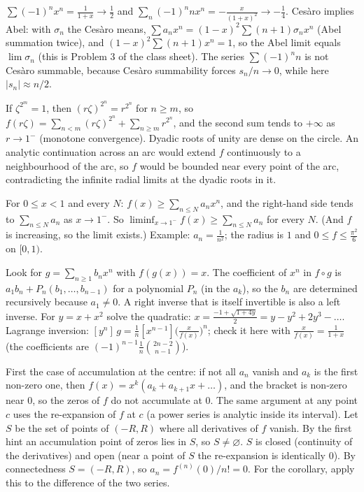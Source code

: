 \documentclass[11pt,a4paper]{article}
\begin{document}
\(\sum(-1)^nx^n=\frac1{1+x}\to\frac12\) and \(\sum_n(-1)^nnx^n=-\frac x{(1+x)^2}\to-\frac14\).
Cesàro implies Abel: with \(\sigma_n\) the Cesàro means, \(\sum a_nx^n=(1-x)^2\sum(n+1)\sigma_nx^n\) (Abel summation twice), and \((1-x)^2\sum(n+1)x^n=1\), so the Abel limit equals \(\lim\sigma_n\) (this is Problem 3 of the class sheet). The series \(\sum(-1)^nn\) is not Cesàro summable, because Cesàro summability forces \(s_n/n\to0\), while here \(\lvert s_n\rvert\approx n/2\).

If \(\zeta^{2^m}=1\), then \((r\zeta)^{2^n}=r^{2^n}\) for \(n\ge m\), so \(f(r\zeta)=\sum_{n\lt m}(r\zeta)^{2^n}+\sum_{n\ge m}r^{2^n}\), and the second sum tends to \(+\infty\) as \(r\to1^-\) (monotone convergence).
Dyadic roots of unity are dense on the circle. An analytic continuation across an arc would extend \(f\) continuously to a neighbourhood of the arc, so \(f\) would be bounded near every point of the arc, contradicting the infinite radial limits at the dyadic roots in it.

For \(0\le x\lt1\) and every \(N\): \(f(x)\ge\sum_{n\le N}a_nx^n\), and the right-hand side tends to \(\sum_{n\le N}a_n\) as \(x\to1^-\). So \(\liminf_{x\to1^-}f(x)\ge\sum_{n\le N}a_n\) for every \(N\). (And \(f\) is increasing, so the limit exists.)
Example: \(a_n=\frac1{n^2}\); the radius is \(1\) and \(0\le f\le\frac{\pi^2}6\) on \([0,1)\).

Look for \(g=\sum_{n\ge1}b_nx^n\) with \(f(g(x))=x\). The coefficient of \(x^n\) in \(f\circ g\) is \(a_1b_n+P_n(b_1,\dots,b_{n-1})\) for a polynomial \(P_n\) (in the \(a_k\)), so the \(b_n\) are determined recursively because \(a_1\ne0\). A right inverse that is itself invertible is also a left inverse.
For \(y=x+x^2\) solve the quadratic: \(x=\frac{-1+\sqrt{1+4y}}2=y-y^2+2y^3-\dots\). Lagrange inversion: \([y^n]\,g=\frac1n[x^{n-1}]\bigl(\frac x{f(x)}\bigr)^n\); check it here with \(\frac x{f(x)}=\frac1{1+x}\) (the coefficients are \((-1)^{n-1}\frac1n\binom{2n-2}{n-1}\)).

First the case of accumulation at the centre: if not all \(a_n\) vanish and \(a_k\) is the first non-zero one, then \(f(x)=x^k(a_k+a_{k+1}x+\dots)\), and the bracket is non-zero near \(0\), so the zeros of \(f\) do not accumulate at \(0\). The same argument at any point \(c\) uses the re-expansion of \(f\) at \(c\) (a power series is analytic inside its interval).
Let \(S\) be the set of points of \((-R,R)\) where all derivatives of \(f\) vanish. By the first hint an accumulation point of zeros lies in \(S\), so \(S\ne\varnothing\). \(S\) is closed (continuity of the derivatives) and open (near a point of \(S\) the re-expansion is identically \(0\)). By connectedness \(S=(-R,R)\), so \(a_n=f^{(n)}(0)/n!=0\). For the corollary, apply this to the difference of the two series.
\end{document}
